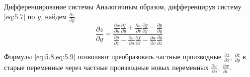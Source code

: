 \begin{tbox}{Дифференцирование системы}
	Аналогичным образом, дифференцируя систему \cref{eq:5.7} по $y$, найдем $\frac{\partial z}{\partial y}$.
	\begin{equation} \label{eq:5.9}
		\frac{\partial z}{\partial y} = \frac{\displaystyle\frac{\partial w}{\partial u} \frac{\partial f}{\partial y} + \frac{\partial w}{\partial v} \frac{\partial g}{\partial y} - \frac{\partial p}{\partial y}}{\displaystyle\frac{\partial p}{\partial z} - \frac{\partial w}{\partial u} \frac{\partial f}{\partial z} - \frac{\partial w}{\partial v} \frac{\partial g}{\partial z}}
	\end{equation}

	Формулы \cref{eq:5.8,eq:5.9} позволяют преобразовать частные производные $\frac{\partial z}{\partial x}$, $\frac{\partial z}{\partial y}$ в старые переменные через частные производные новых переменных $\frac{\partial w}{\partial u}$, $\frac{\partial w}{\partial v}$.
\end{tbox}

